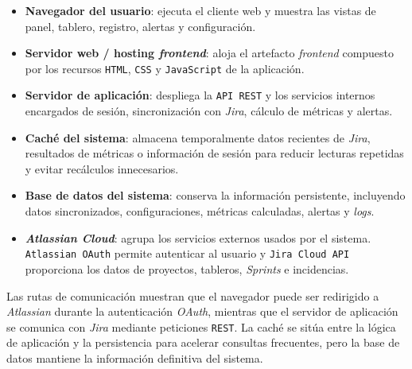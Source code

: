 \begin{itemize}
    \item \textbf{Navegador del usuario}: ejecuta el cliente web y muestra las vistas de panel, tablero, registro, alertas y configuración.
    \item \textbf{Servidor web / hosting \textit{frontend}}: aloja el artefacto \textit{frontend} compuesto por los recursos \texttt{HTML}, \texttt{CSS} y \texttt{JavaScript} de la aplicación.
    \item \textbf{Servidor de aplicación}: despliega la \texttt{API REST} y los servicios internos encargados de sesión, sincronización con \textit{Jira}, cálculo de métricas y alertas.
    \item \textbf{Caché del sistema}: almacena temporalmente datos recientes de \textit{Jira}, resultados de métricas o información de sesión para reducir lecturas repetidas y evitar recálculos innecesarios.
    \item \textbf{Base de datos del sistema}: conserva la información persistente, incluyendo datos sincronizados, configuraciones, métricas calculadas, alertas y \textit{logs}.
    \item \textbf{\textit{Atlassian Cloud}}: agrupa los servicios externos usados por el sistema. \texttt{Atlassian OAuth} permite autenticar al usuario y \texttt{Jira Cloud API} proporciona los datos de proyectos, tableros, \textit{Sprints} e incidencias.
\end{itemize}

Las rutas de comunicación muestran que el navegador puede ser redirigido a \textit{Atlassian} durante la autenticación \textit{OAuth}, mientras que el servidor de aplicación se comunica con \textit{Jira} mediante peticiones \texttt{REST}. La caché se sitúa entre la lógica de aplicación y la persistencia para acelerar consultas frecuentes, pero la base de datos mantiene la información definitiva del sistema.
\FloatBarrier
